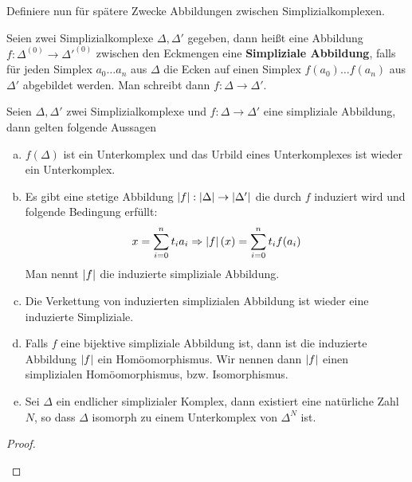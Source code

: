 Definiere nun für spätere Zwecke Abbildungen zwischen Simplizialkomplexen.

\begin{Def}
  Seien zwei Simplizialkomplexe $\Delta, \Delta'$ gegeben, dann heißt
  eine Abbildung $f: \Delta^{(0)} \rightarrow \Delta'^{(0)}$ zwischen
  den Eckmengen eine \textbf{Simpliziale Abbildung}, falls für jeden
  Simplex $a_0 \ldots a_n$ aus $\Delta$ die Ecken auf einen Simplex
  $f(a_0) \ldots f(a_n)$ aus $\Delta'$ abgebildet werden. Man schreibt
  dann $f: \Delta \rightarrow \Delta'$.
\end{Def}


\begin{Satz}
  Seien $\Delta, \Delta'$ zwei Simplizialkomplexe und
  $f: \Delta \rightarrow \Delta'$ eine simpliziale Abbildung, dann
  gelten folgende Aussagen
	\begin{enumerate}[(a)]
        \item $f(\Delta)$ ist ein Unterkomplex und das Urbild eines
          Unterkomplexes ist wieder ein Unterkomplex.
        \item Es gibt eine stetige Abbildung
          $\left| f \right| : \left| \Delta \right| \rightarrow \left| \Delta' \right|$ die durch
          $f$ induziert wird und folgende Bedingung erfüllt:
          \begin{gather*}
            x = \sum\limits_{i=0}^{n} t_i a_i \Rightarrow \left| f \right|(x) = \sum\limits_{i=0}^{n}
            t_i f(a_i)
          \end{gather*}
          Man nennt $\left| f \right|$ die induzierte simpliziale Abbildung.
        \item Die Verkettung von induzierten simplizialen Abbildung
          ist wieder eine induzierte Simpliziale.
        \item Falls $f$ eine bijektive simpliziale Abbildung ist, dann
          ist die induzierte Abbildung $\left| f \right|$ ein
          Homöomorphismus. Wir nennen dann $\left| f \right|$ einen simplizialen
          Homöomorphismus, bzw. Isomorphismus.
        \item Sei $\Delta$ ein endlicher simplizialer Komplex, dann
          existiert eine natürliche Zahl $N$, so dass $\Delta$
          isomorph zu einem Unterkomplex von $\Delta^N$ ist.
	\end{enumerate}
	\begin{proof}
          \begin{enumerate}[(a)]

          \end{enumerate}
	\end{proof}
\end{Satz}

